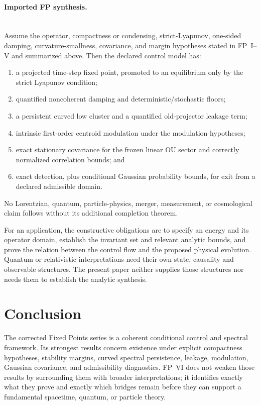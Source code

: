 \documentclass[11pt]{article}
\begin{document}
\paragraph{Imported FP synthesis.}\mbox{}\\
Assume the operator, compactness or condensing, strict-Lyapunov, one-sided
damping, curvature-smallness, covariance, and margin hypotheses stated in
FP~I--V and summarized above. Then the declared control model has:
\begin{enumerate}
\item a projected time-step fixed point, promoted to an equilibrium only by
the strict Lyapunov condition;
\item quantified noncoherent damping and deterministic/stochastic floors;
\item a persistent curved low cluster and a quantified old-projector leakage
term;
\item intrinsic first-order centroid modulation under the modulation
hypotheses;
\item exact stationary covariance for the frozen linear OU sector and
correctly normalized correlation bounds; and
\item exact detection, plus conditional Gaussian probability bounds, for
exit from a declared admissible domain.
\end{enumerate}
No Lorentzian, quantum, particle-physics, merger, measurement, or cosmological
claim follows without its additional completion theorem.

For an application, the constructive obligations are to specify an energy and
its operator domain, establish the invariant set and relevant analytic bounds,
and prove the relation between the control flow and the proposed physical
evolution. Quantum or relativistic interpretations need their own state,
causality and observable structures. The present paper neither supplies those
structures nor needs them to establish the analytic synthesis.

\section{Conclusion}

The corrected Fixed Points series is a coherent conditional control and
spectral framework. Its strongest results concern existence under explicit
compactness hypotheses, stability margins, curved spectral persistence,
leakage, modulation, Gaussian covariance, and admissibility diagnostics. FP~VI
does not weaken those results by surrounding them with broader interpretations;
it identifies exactly what they prove and exactly which bridges remain before
they can support a fundamental spacetime, quantum, or particle theory.
\end{document}
